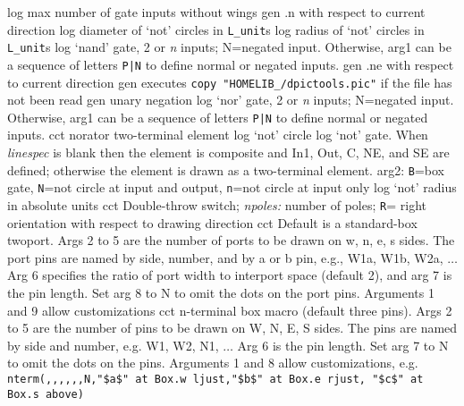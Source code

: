   {log}
  {max number of gate inputs without wings}
%
  {gen}
  {.n with respect to current direction}
  {log}
  {diameter of `not' circles in {\tt L\_unit}s}
  {log}
  {radius of `not' circles in {\tt L\_unit}s}
  {log}
  {`nand' gate, 2 or {\sl n\/} inputs; N=negated input.
   Otherwise, arg1 can be a sequence of letters {\tt P|N} to define
   normal or negated inputs.
    }
  {gen}
  {.ne with respect to current direction}
  {gen}
  {executes {\tt copy "HOMELIB\_/dpictools.pic"} if the file has
  not been read}
  {gen}
  {unary negation}
  {log}
  {`nor' gate, 2 or {\sl n\/} inputs; N=negated input.
   Otherwise, arg1 can be a sequence of letters {\tt P|N} to define
   normal or negated inputs.
    }
  {cct}
  { norator two-terminal element }
  {log}
  {`not' circle}
  {log}
  {`not' gate.
   When {\sl linespec} is blank then the element is composite and In1,
   Out, C, NE, and SE are defined; otherwise the element is drawn as a
   two-terminal element. arg2: {\tt B}=box gate, {\tt N}=not circle at
   input and output, {\tt n}=not circle at input only
    }
  {log}
  {`not' radius in absolute units}
  {cct}
  {Double-throw switch; {\sl npoles:} number of poles;
   {\tt R}= right orientation with respect to drawing direction
   }
  {cct}
  { Default is a standard-box twoport.  Args 2 to 5 are
    the number of ports to be drawn on w, n, e, s sides.  The port pins
    are named by side, number, and by a or b pin, e.g., W1a, W1b, W2a,
    $\ldots$ Arg 6 specifies the ratio of port width to interport space
    (default 2), and arg 7 is the pin length.  Set arg 8 to N to omit
    the dots on the port pins. Arguments 1 and 9 allow customizations
   }
  {cct}
  {n-terminal box macro (default three pins).
   Args 2 to 5 are the number of pins to be drawn on W, N, E, S
   sides.  The pins are named by side and number, e.g. W1, W2, N1,
   $\ldots$ Arg 6 is the pin length.  Set arg 7 to N to omit the
   dots on the pins. Arguments 1 and 8 allow customizations, e.g.
   {\tt nterm(,{,},{,},{,}N,"\$a\$" at Box.w ljust,"\$b\$" at Box.e rjust,
      "\$c\$" at Box.s above)} }
